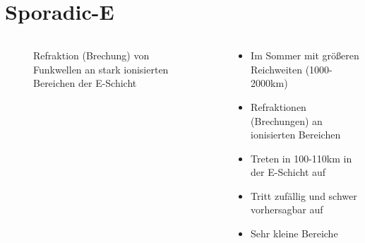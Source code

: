 
\section{Sporadic-E}
\label{section:sporadic_e_1}
\begin{frame}%

\begin{columns}
    \begin{column}{0.48\textwidth}
    
\begin{figure}
    \caption{\scriptsize Refraktion (Brechung) von Funkwellen an stark ionisierten Bereichen der E-Schicht}
    \label{n_sporadic_e}
\end{figure}


    \end{column}
   \begin{column}{0.48\textwidth}
       \begin{itemize}
  \item Im Sommer mit größeren Reichweiten (1000-2000km)
  \item Refraktionen (Brechungen) an ionisierten Bereichen
  \item Treten in 100-110km in der E-Schicht auf
  \item Tritt zufällig und schwer vorhersagbar auf
  \item Sehr kleine Bereiche
  \end{itemize}

   \end{column}
\end{columns}

\end{frame}

